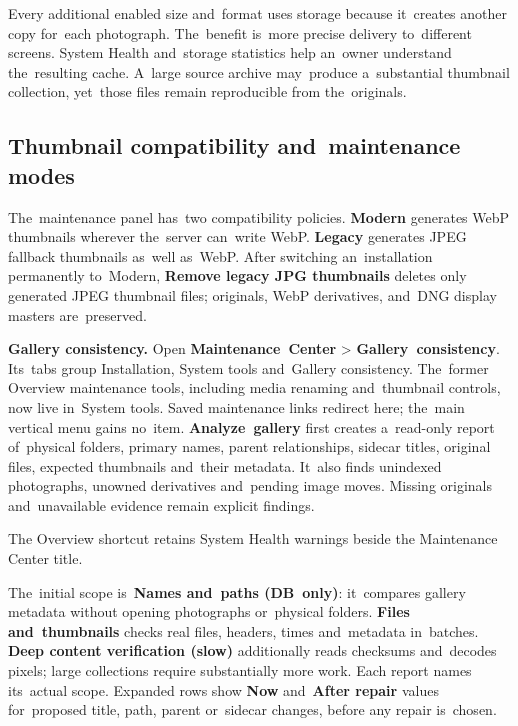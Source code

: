 \documentclass[11pt,a4paper]{article}
\newcommand{\ui}[1]{\textbf{#1}}
\begin{document}
Every additional enabled size and~format uses storage because it~creates another
copy for~each photograph. The~benefit is~more precise delivery to~different
screens. System Health and~storage statistics help an~owner understand
the~resulting cache. A~large source archive may~produce a~substantial thumbnail
collection, yet~those files remain reproducible from the~originals.

\subsection{Thumbnail compatibility and~maintenance modes}

The~maintenance panel has~two compatibility policies. \ui{Modern} generates WebP
thumbnails wherever the~server can~write WebP. \ui{Legacy} generates JPEG
fallback thumbnails as~well as~WebP. After switching an~installation permanently
to~Modern, \ui{Remove legacy JPG thumbnails} deletes only generated JPEG
thumbnail files; originals, WebP derivatives, and~DNG display masters
are~preserved.

\textbf{Gallery consistency.} Open \ui{Maintenance~Center} >
\ui{Gallery~consistency}. Its~tabs group Installation, System tools
and~Gallery consistency. The~former Overview maintenance tools, including
media renaming and~thumbnail controls, now live in~System tools. Saved
maintenance links redirect here; the~main vertical menu gains no~item.
\ui{Analyze~gallery} first creates a~read-only report of~physical folders,
primary names, parent relationships, sidecar titles, original files, expected
thumbnails and~their metadata. It~also finds unindexed photographs, unowned
derivatives and~pending image moves. Missing originals and~unavailable
evidence remain explicit findings.

The Overview shortcut retains System Health warnings beside the Maintenance
Center title.

The~initial scope is~\ui{Names and~paths (DB~only)}: it~compares gallery
metadata without opening photographs or~physical folders. \ui{Files
and~thumbnails} checks real files, headers, times and~metadata in~batches.
\ui{Deep content verification (slow)} additionally reads checksums and~decodes
pixels; large collections require substantially more work. Each report names
its~actual scope. Expanded rows show \ui{Now} and~\ui{After repair} values
for~proposed title, path, parent or~sidecar changes, before any repair
is~chosen.
\end{document}
